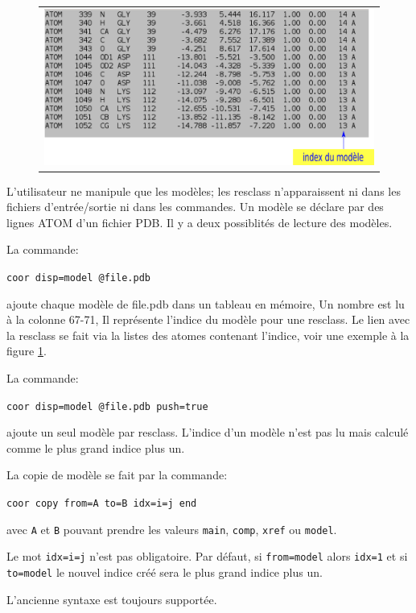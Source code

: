    \begin{figure}[!htbp]
     \centering
     \begin{tabular}{c}
       \includegraphics[width=12cm]{figure/PDB.png} 
     \end{tabular}     
     \caption{\textbt{}}
\label{fig:PDB}
   \end{figure}


L'utilisateur ne manipule que les modèles; les resclass n'apparaissent ni dans les fichiers d'entrée/sortie ni dans les commandes. Un modèle se déclare par des lignes ATOM d'un fichier PDB. 
Il y a deux possiblités de lecture des modèles.

La commande:

\verb!coor disp=model @file.pdb!

ajoute chaque modèle de file.pdb dans un tableau en mémoire, Un nombre est lu à la colonne 67-71, Il représente l'indice du modèle pour une resclass. Le lien avec la resclass se fait via la listes des atomes contenant l'indice, voir une exemple à la figure \ref{fig:PDB}.

La commande:

\verb!coor disp=model @file.pdb push=true!

ajoute un seul modèle par resclass. L'indice d'un modèle n'est pas lu mais calculé comme le plus grand indice plus un. 

La copie de modèle se fait par la commande:

\verb!coor copy from=A to=B idx=i=j end!

avec \verb!A! et \verb!B!  pouvant prendre les valeurs \verb!main!, \verb!comp!, \verb!xref! ou \verb!model!.

Le mot \verb!idx=i=j! n'est pas obligatoire. Par défaut, si \verb!from=model! alors \verb!idx=1! et si \verb!to=model!  le nouvel indice créé sera le plus grand indice plus un.

L'ancienne syntaxe est toujours supportée.

